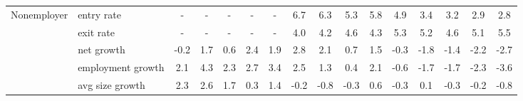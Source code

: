 \begin{tabular}{llcccccccccccccc}
\cline{1-16}
\multirow{5}{*}{Nonemployer} & entry rate &     - &    - &    - &    - &     - &   6.7 &   6.3 &   5.3 &   5.8 &   4.9 &   3.4 &   3.2 &   2.9 &   2.8 \\
            & exit rate &     - &    - &    - &    - &     - &   4.0 &   4.2 &   4.6 &   4.3 &   5.3 &   5.2 &   4.6 &   5.1 &   5.5 \\
            & net growth &  -0.2 &  1.7 &  0.6 &  2.4 &   1.9 &   2.8 &   2.1 &   0.7 &   1.5 &  -0.3 &  -1.8 &  -1.4 &  -2.2 &  -2.7 \\
            & employment growth &   2.1 &  4.3 &  2.3 &  2.7 &   3.4 &   2.5 &   1.3 &   0.4 &   2.1 &  -0.6 &  -1.7 &  -1.7 &  -2.3 &  -3.6 \\
            & avg size growth &   2.3 &  2.6 &  1.7 &  0.3 &   1.4 &  -0.2 &  -0.8 &  -0.3 &   0.6 &  -0.3 &   0.1 &  -0.3 &  -0.2 &  -0.8 \\
\bottomrule
\end{tabular}
